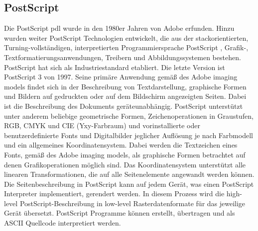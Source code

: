 \subsection{PostScript}
Die PostScript \gls{pdl} wurde in den 1980er Jahren von Adobe erfunden. \cite{adobe-postscript} Hinzu wurden weiter PostScript Technologien entwickelt, die aus der stackorientierten, Turning-vollständigen, interpretierten Programmiersprache PostScript \cite{wiki-postscript}, Grafik-, Textformatierungsanwendungen, Treibern und Abbildungssystemen bestehen. PostScript hat sich als Industriestandard etabliert. Die letzte Version ist PostScript 3 von 1997. Seine primäre Anwendung gemäß des Adobe imaging models findet sich in der Beschreibung von Textdarstellung, graphische Formen und Bildern auf gedruckten oder auf dem Bildschirm angezeigten Seiten. Dabei ist die Beschreibung des Dokuments geräteunabhängig. PostScript unterstützt unter anderem beliebige geometrische Formen, Zeichenoperationen in Graustufen, RGB, CMYK und CIE (Yxy-Farbraum) und  vorinstallierte oder benutzerdefinierte Fonts und Digitalbilder jeglicher Auflösung je nach Farbmodell und ein allgemeines Koordinatensystem.
Dabei werden die Textzeichen eines Fonts, gemäß des Adobe imaging models, als graphische Formen betrachtet auf denen Grafikoperationen möglich sind. Das Koordinatensystem unterstützt alle linearen Transformationen, die auf alle Seitenelemente angewandt werden können. Die Seitenbeschreibung in PostScript kann auf jedem Gerät, was einen PostScript Interpreter implementiert, gerendert werden. In diesem Prozess wird die high-level PostScript-Beschreibung in low-level Rasterdatenformate für das jeweilige Gerät übersetzt. PostScript Programme können erstellt, übertragen und als ASCII Quellcode interpretiert werden. \cite{adobe-postscript}

